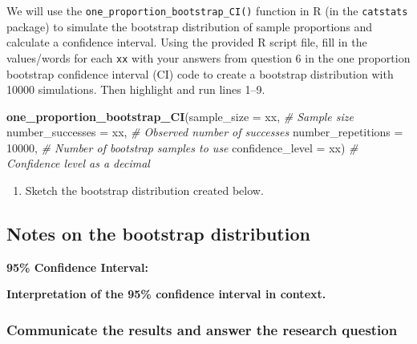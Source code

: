 \documentclass[
]{report}
\newenvironment{Shaded}{\begin{snugshade}}{\end{snugshade}}
\newcommand{\AttributeTok}[1]{\textcolor[rgb]{0.13,0.29,0.53}{#1}}
\newcommand{\CommentTok}[1]{\textcolor[rgb]{0.56,0.35,0.01}{\textit{#1}}}
\newcommand{\DecValTok}[1]{\textcolor[rgb]{0.00,0.00,0.81}{#1}}
\newcommand{\FunctionTok}[1]{\textcolor[rgb]{0.13,0.29,0.53}{\textbf{#1}}}
\newcommand{\NormalTok}[1]{#1}
\providecommand{\tightlist}{%
  \setlength{\itemsep}{0pt}\setlength{\parskip}{0pt}}
\begin{document}
\vspace{.1in}

We will use the \texttt{one\_proportion\_bootstrap\_CI()} function in R (in the \texttt{catstats} package) to simulate the bootstrap distribution of sample proportions and calculate a confidence interval. Using the provided R script file, fill in the values/words for each \texttt{xx} with your answers from question 6 in the one proportion bootstrap confidence interval (CI) code to create a bootstrap distribution with 10000 simulations. Then highlight and run lines 1--9.

\begin{Shaded}
\begin{Highlighting}[]
\FunctionTok{one\_proportion\_bootstrap\_CI}\NormalTok{(}\AttributeTok{sample\_size =}\NormalTok{ xx, }\CommentTok{\# Sample size}
                    \AttributeTok{number\_successes =}\NormalTok{ xx, }\CommentTok{\# Observed number of successes}
                    \AttributeTok{number\_repetitions =} \DecValTok{10000}\NormalTok{, }\CommentTok{\# Number of bootstrap samples to use}
                    \AttributeTok{confidence\_level =}\NormalTok{ xx) }\CommentTok{\# Confidence level as a decimal}
\end{Highlighting}
\end{Shaded}

\begin{enumerate}
\def\labelenumi{\arabic{enumi}.}
\setcounter{enumi}{6}
\tightlist
\item
  Sketch the bootstrap distribution created below.
\end{enumerate}

\vspace{1.8in}

\subsection*{Notes on the bootstrap distribution}\label{notes-on-the-bootstrap-distribution}

\vspace{1.5in}

\textbf{95\% Confidence Interval:}

\textbf{Interpretation of the 95\% confidence interval in context.}

\vspace{.6in}

\subsubsection*{Communicate the results and answer the research question}\label{communicate-the-results-and-answer-the-research-question-1}
\end{document}

